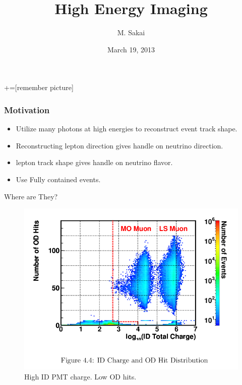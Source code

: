 \documentclass{beamer} %
\author{M. Sakai}
\title{High Energy Imaging}
\date{March 19, 2013}
\newcommand{\placetextbox}[3]{%
  \setbox0=\hbox{#3}%
  \AddToShipoutPictureFG*{%
    \put(\LenToUnit{#1\paperwidth},\LenToUnit{#2\paperheight}){\vtop{{\null}\makebox[0pt][c]{#3}}}%
  }%
}%
\begin{document}
\frame{\titlepage}
+=[remember picture]

\everymath{\displaystyle}

\begin{frame}
\frametitle{Motivation}
	\begin{itemize}
		\item Utilize many photons at high energies to reconstruct event track shape.
		\item Reconstructing lepton direction gives handle on neutrino direction.
		\item lepton track shape gives handle on neutrino flavor.
		\item Use Fully contained events.
	\end{itemize}
\end{frame}

\begin{frame}{Where are They?}
	\begin{figure}
		\includegraphics[width=\textwidth,height=0.7\textheight,keepaspectratio]
			{material/high_energy_event_candidates_sanshiro.png}
		\caption{
			High ID PMT charge. Low OD hits.
		}
	\end{figure}
\end{frame}
\end{document}
